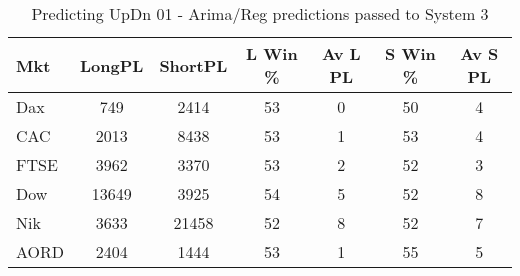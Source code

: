 \begin{table}[ht]
\centering
\caption[Predicting UpDn 01 - Arima/Reg predictions passed to System 3.]{Predicting UpDn 01 - Arima/Reg predictions passed to System 3} 
\label{tab:chp_ts:01_arima_reg_sys}
\begin{tabular}{lcccccc}
  \toprule Mkt & LongPL & ShortPL & L Win \% & Av L PL & S Win \% & Av S PL \\ 
  \midrule Dax & 749 & 2414 & 53 & 0 & 50 & 4 \\ 
  CAC & 2013 & 8438 & 53 & 1 & 53 & 4 \\ 
  FTSE & 3962 & 3370 & 53 & 2 & 52 & 3 \\ 
  Dow & 13649 & 3925 & 54 & 5 & 52 & 8 \\ 
  Nik & 3633 & 21458 & 52 & 8 & 52 & 7 \\ 
  AORD & 2404 & 1444 & 53 & 1 & 55 & 5 \\ 
   \bottomrule \end{tabular}
\end{table}
